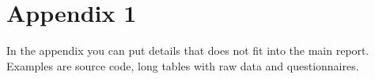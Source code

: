 \documentclass[a4paper,12pt]{article}
\begin{document}
\newpage


%
\newpage

\hypersetup{urlcolor=black}


\newpage
\setcounter{page}{1} %
\appendix

\section{Appendix 1} 
In the appendix you can put details that does not fit into the main report. Examples are source code, long tables with raw data and questionnaires.
\end{document}

